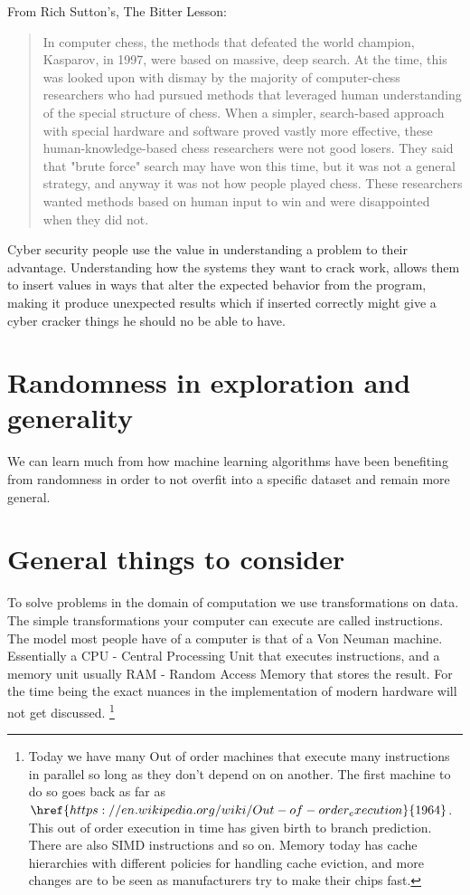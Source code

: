 \documentclass[a4paper]{article}
\begin{document}
From Rich Sutton's, The Bitter Lesson:
\begin{quotation}
In computer chess, the methods that defeated the world champion, Kasparov, in 1997, were based on massive, deep search. At the time, this was looked upon with dismay by the majority of computer-chess researchers who had pursued methods that leveraged human understanding of the special structure of chess. When a simpler, search-based approach with special hardware and software proved vastly more effective, these human-knowledge-based chess researchers were not good losers. They said that "brute force" search may have won this time, but it was not a general strategy, and anyway it was not how people played chess. These researchers wanted methods based on human input to win and were disappointed when they did not.
\end{quotation}


Cyber security people use the value in understanding a problem to their advantage. Understanding how the systems they want to crack work, allows them to insert values in ways that alter the expected behavior from the program, making it produce unexpected results which if inserted correctly might give a cyber cracker things he should no be able to have.  

\section{Randomness in exploration and generality}
We can learn much from how machine learning algorithms have been benefiting from randomness in order to not overfit into a specific dataset and remain more general.


\section{General things to consider}
To solve problems in the domain of computation we use transformations on data. The simple 
transformations your computer can execute are called instructions. The model most people 
have of a computer is that of a Von Neuman machine. Essentially a CPU - Central Processing 
Unit that executes instructions, and a memory unit usually RAM - Random Access Memory 
that stores the result. For the time being the exact nuances in the implementation of 
modern hardware will not get discussed. 
\footnote{Today we have many Out of order machines that execute many instructions in parallel so long as they don't depend on on another. The first machine to do so goes back as far as $\href{https://en.wikipedia.org/wiki/Out-of-order_execution}{1964}$. This out of order execution in time has given birth to branch prediction. There are also SIMD instructions and so on. Memory today has cache hierarchies with different policies for handling cache eviction, and more changes are to be seen as manufacturers try to make their chips fast.}  
\end{document}
